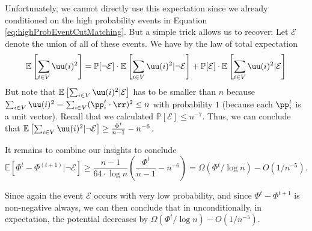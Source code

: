 Unfortunately, we cannot directly use this expectation since we already conditioned on the high probability events in Equation \eqref{eq:highProbEventCutMatching}. But a simple trick allows us to recover: Let $\mathcal{E}$ denote the union of all of these events. We have by the law of total expectation
\[
\mathbb{E}\left[\sum_{i \in V} \uu(i)^2 \right] = \mathbb{P}[\neg \mathcal{E}] \cdot \mathbb{E}\left[\sum_{i \in V} \uu(i)^2 | \neg \mathcal{E} \right] + \mathbb{P}[\mathcal{E}] \cdot \mathbb{E}\left[\sum_{i \in V} \uu(i)^2 | \mathcal{E} \right]
\]
But note that $\mathbb{E}\left[\sum_{i \in V} \uu(i)^2 | \mathcal{E} \right]$ has to be smaller than $n$ because $\sum_{i \in V} \uu(i)^2 = \sum_{i \in V} (\pp_i^t \cdot \rr)^2 \leq n$ with probability $1$ (because each $\pp_i^t$ is a unit vector). Recall that we calculated $\mathbb{P}[\mathcal{E}] \leq n^{-7}$. Thus, we can conclude that $\mathbb{E}\left[\sum_{i \in V} \uu(i)^2 | \neg \mathcal{E} \right] \geq \frac{\Phi^t}{n-1} - n^{-6}$.

It remains to combine our insights to conclude
\[
\mathbb{E}[\Phi^{t} - \Phi^{(t+1)} | \neg \mathcal{E}] \geq \frac{n-1}{64 \cdot \log n} \left( \frac{\Phi^t}{n-1} - n^{-6} \right) = \Omega(\Phi^t / \log n) - O(1/n^{-5}).
\]

Since again the event $\mathcal{E}$ occurs with very low probability, and since $\Phi^t - \Phi^{t+1}$ is non-negative always, we can then conclude that in unconditionally, in expectation, the potential decreases by $\Omega(\Phi^t / \log n) - O(1/n^{-5}).$


